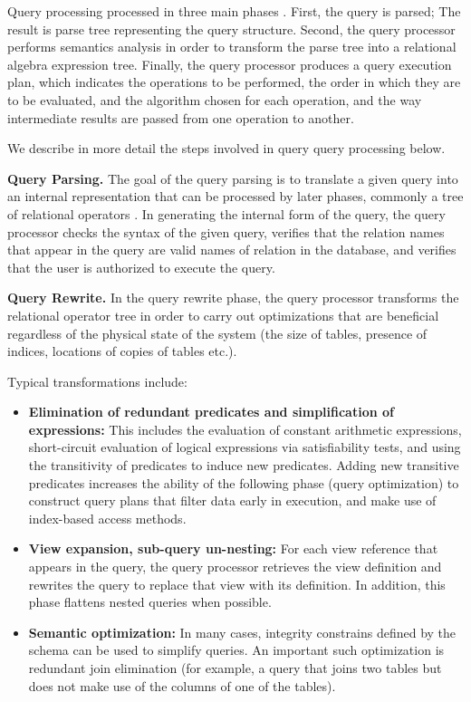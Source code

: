 Query processing processed in three main phases \cite{hellerstein:databasearchitecture, kossmann:distqeuryprocessing}.
First, the query is parsed;
The result is parse tree representing the query structure.
Second, the query processor performs semantics analysis in order to transform the parse tree into a relational algebra expression tree.
Finally, the query processor produces a query execution plan,
which indicates the operations to be performed, the order in which they are to be evaluated,
and the algorithm chosen for each operation, and the way intermediate results are passed from one operation to another.

We describe in more detail the steps involved in query query processing below.

\bigskip
\noindent
\textbf{Query Parsing.}
The goal of the query parsing is to translate a given query into an internal representation that can
be processed by later phases, commonly a tree of relational operators \cite{silberschatz:dbbook}.
In generating the internal form of the query,
the query processor checks the syntax of the given query,
verifies that the relation names that appear in the query are valid names of relation in the database,
and verifies that the user is authorized to execute the query.

\bigskip
\noindent
\textbf{Query Rewrite.}
In the query rewrite phase, the query processor transforms the relational operator tree in order to carry out optimizations that are
beneficial regardless of the physical state of the system (the size of tables, presence of indices, locations of copies of tables etc.).

Typical transformations include:
\begin{itemize}
  \item \textbf{Elimination of redundant predicates and simplification of expressions:}
  This includes the evaluation of constant arithmetic expressions,
  short-circuit evaluation of logical expressions via satisfiability tests,
  and using the transitivity of predicates to induce new predicates.
  Adding new transitive predicates increases the ability of the following phase (query optimization) to construct query
  plans that filter data early in execution, and make use of index-based access methods.

  \item \textbf{View expansion, sub-query un-nesting:}
  For each view reference that appears in the query, the query processor retrieves the view definition and rewrites the
  query to replace that view with its definition.
  In addition, this phase flattens nested queries when possible.

  \item \textbf{Semantic optimization:}
  In many cases, integrity constrains defined by the schema can be used to simplify queries.
  An important such optimization is redundant join elimination (for example, a query that joins two tables but does not
  make use of the columns of one of the tables).
\end{itemize}

